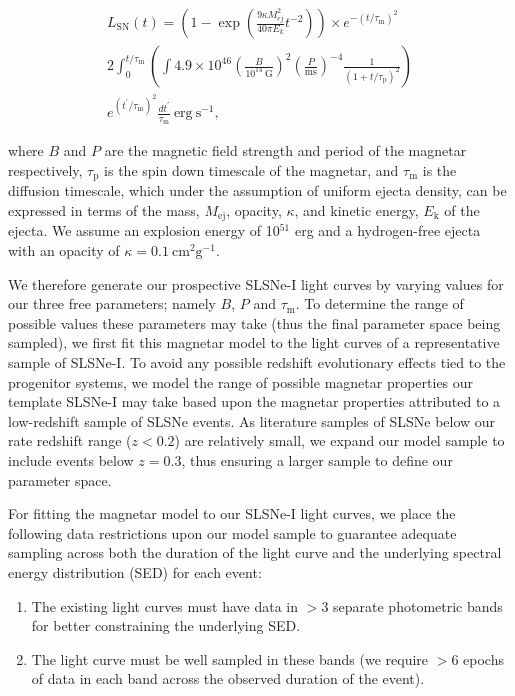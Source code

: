 \documentclass[a4paper,fleqn,usenatbib]{mnras}
\begin{document}
\begin{multline}
L_{\mathrm{SN}}\left ( t \right )= \left(1- \exp{\left(\frac{9\kappa M_{ej}^{2}}{40\pi E_{k}}t^{-2} \right)}\right)\times e^{-(t/\tau_{\mathrm{m}})^{2}} \\ 2\int_{0}^{t/\tau_{\mathrm{m}}}
\left(\int 4.9\times10^{46} \left(\frac{B}{10^{14}~\mathrm{G}} \right)^{2}\left(\frac{P}{\mathrm{ms}} \right)^{-4} \frac{1}{(1 + t/\tau_{\mathrm{p}})^{2}}\right ) \\ e^{(t^{\prime}/\tau_{\mathrm{m}})^{2}}\frac{dt^{\prime}}{\tau_{\mathrm{m}}} \mathrm{~ erg~ s^{-1}},
\label{equation_magnetar}
\end{multline}

where $B$ and $P$ are the magnetic field strength and period of the magnetar respectively, $\tau_{\mathrm{p}}$ is the spin down timescale of the magnetar, and $\tau_{\mathrm{m}}$ is the diffusion timescale, which under the assumption of uniform ejecta density, can be expressed in terms of the mass, $M_{\mathrm{ej}}$, opacity, $\kappa$, and kinetic energy, $E_{\mathrm{k}}$ of the ejecta. We assume an explosion energy of 10$^{51}$ erg and a hydrogen-free ejecta with an opacity of $\kappa = 0.1~\mathrm{cm}^{2} \mathrm{g}^{-1}$. 

We therefore generate our prospective SLSNe-I light curves by varying values for our three free parameters; namely $B$, $P$ and $\tau_{\mathrm{m}}$. To determine the range of possible values these parameters may take (thus the final parameter space being sampled), we first fit this magnetar model to the light curves of a representative sample of SLSNe-I. To avoid any possible redshift evolutionary effects tied to the progenitor systems, we model the range of possible magnetar properties our template SLSNe-I may take based upon the magnetar properties attributed to a low-redshift sample of SLSNe events. As literature samples of SLSNe below our rate redshift range ($z<0.2$) are relatively small, we expand our model sample to include events below $z=0.3$, thus ensuring a larger sample to define our parameter space. 

For fitting the magnetar model to our SLSNe-I light curves, we place the following data restrictions upon our model sample to guarantee adequate sampling across both the duration of the light curve and the underlying spectral energy distribution (SED) for each event:
\begin{enumerate}
    \item The existing light curves must have data in $>$3 separate photometric bands for better constraining the underlying SED.
    \item The light curve must be well sampled in these bands (we require $>$6 epochs of data in each band across the observed duration of the event).
\end{enumerate}
\end{document}
